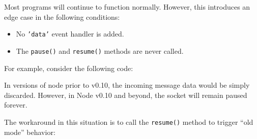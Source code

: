 Most programs will continue to function normally. However, this
introduces an edge case in the following conditions:

\begin{itemize}
\item
  No \texttt{'data'} event handler is added.
\item
  The \texttt{pause()} and \texttt{resume()} methods are never called.
\end{itemize}

For example, consider the following code:

\begin{Shaded}
\begin{Highlighting}[]
\NormalTok{(}

  \NormalTok{(}\NormalTok{, }\NormalTok{() \{}
    \NormalTok{(}\NormalTok{);}
  \NormalTok{\});}

\NormalTok{(}\NormalTok{);}
\end{Highlighting}
\end{Shaded}

In versions of node prior to v0.10, the incoming message data would be
simply discarded. However, in Node v0.10 and beyond, the socket will
remain paused forever.

The workaround in this situation is to call the \texttt{resume()} method
to trigger ``old mode'' behavior:

\begin{Shaded}
\begin{Highlighting}[]
\NormalTok{(}

  \NormalTok{(}\NormalTok{, }\NormalTok{() \{}
    \NormalTok{(}\NormalTok{);}
  \NormalTok{\});}

  \NormalTok{();}

\NormalTok{(}\NormalTok{);}
\end{Highlighting}
\end{Shaded}

